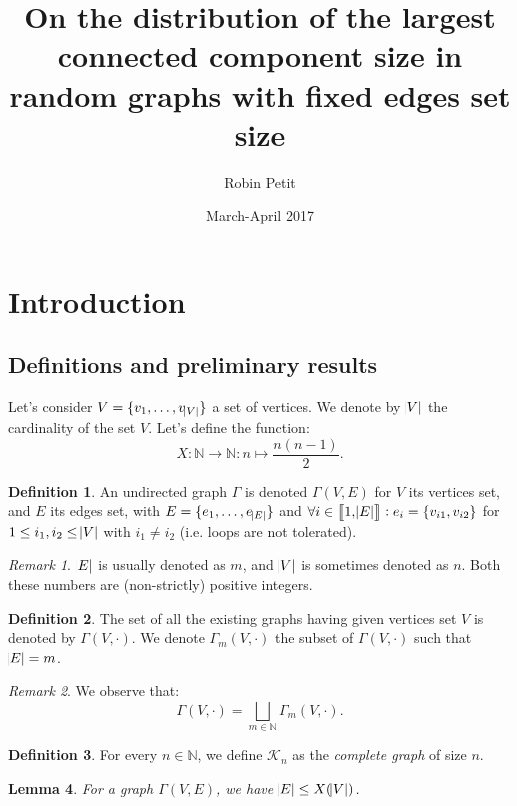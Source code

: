 \documentclass{article}
\author{Robin Petit}
\date{March-April 2017}
\title{On the distribution of the largest connected component size in random graphs with fixed edges set size}
\newtheorem{lemma}{Lemma}[section]
\theoremstyle{definition}
\newtheorem{definition}[lemma]{Definition}
\theoremstyle{remark}
\newtheorem*{remark}{Remark}
\newcommand{\N}{\mathbb N}
\newcommand{\intint}[2]{\left\llbracket#1, #2\right\rrbracket}
\begin{document}
\maketitle
\tableofcontents

\section{Introduction}
	\subsection{Definitions and preliminary results}
		Let's consider $V = \{v_1, \ldots, v_{\abs V}\}$ a set of vertices. We denote by $\abs V$ the cardinality of the set $V$. Let's define
		the function:
		\[X : \N \to \N : n \mapsto \frac {n(n-1)}2.\]

		\begin{definition} An undirected graph $\Gamma$ is denoted $\Gamma(V, E)$ for $V$ its vertices set, and $E$ its edges set, with $E = \{e_1, \ldots, e_{\abs E}\}$
		and $\forall i \in \intint 1{\abs E} : e_i = \{v_{i1}, v_{i2}\}$ for $1 \leq i_1, i_2 \leq \abs V$ with $i_1 \neq i_2$ (i.e. loops are not tolerated).
		\end{definition}

		\begin{remark} $\abs E$ is usually denoted as $m$, and $\abs V$ is sometimes denoted as $n$. Both these numbers are (non-strictly) positive integers.
		\end{remark}

		\begin{definition} The set of all the existing graphs having given vertices set $V$ is denoted by $\Gamma(V, \cdot)$. We denote $\Gamma_m(V, \cdot)$
		the subset of $\Gamma(V, \cdot)$ such that $\abs E = m$.
		\end{definition}

		\begin{remark} We observe that:
		\[\Gamma(V, \cdot) = \bigsqcup_{m \in \N}\Gamma_m(V, \cdot).\]
		\end{remark}

		\begin{definition} For every $n \in \N$, we define $\mathcal K_n$ as the \textit{complete graph} of size $n$.
		\end{definition}

		\begin{lemma} For a graph $\Gamma(V, E)$, we have $\abs E \leq X(\abs V)$.
		\end{lemma}
\end{document}
